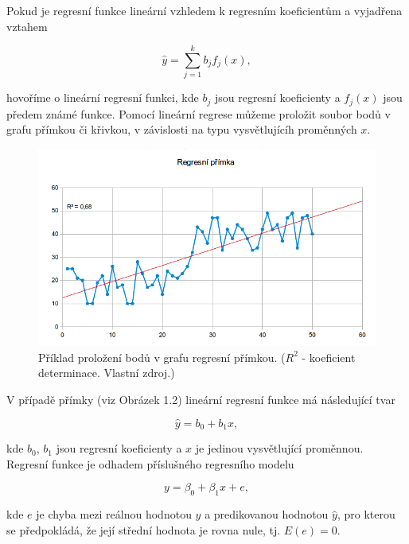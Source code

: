 \documentclass[a4paper,12pt,twoside]{scrreprt}
\begin{document}
Pokud je regresní funkce lineární vzhledem k regresním koeficientům a vyjadřena vztahem 

\begin{equation}
\hat{y} = \sum_{j=1}^{k}b_jf_j(x),
\end{equation}

hovoříme o lineární regresní funkci, kde \textit{$b_j$} jsou regresní koeficienty a \textit{$f_j$}$(x)$ jsou předem známé funkce. Pomocí lineární regrese můžeme proložit soubor bodů v grafu přímkou či křivkou, v závislosti na typu vysvětlujícíh proměnných $x$. 

\begin{figure}[h]
  \centering
  \includegraphics[width=15cm]{pictures/primka.png}
  \caption{Příklad proložení bodů v grafu regresní přímkou. \newline($R^2$ - koeficient determinace. Vlastní zdroj.)}
  \label{fig:přímka}
\end{figure}

V případě přímky (viz Obrázek 1.2) lineární regresní funkce má následující tvar

\begin{equation}
\hat{y} = b_0 + b_1x,
\end{equation}

kde $b_0$, $b_1$ jsou regresní koeficienty a $x$ je jedinou vysvětlující proměnnou. Regresní funkce je odhadem příslušného regresního modelu

\begin{equation}
y = \beta_0 + \beta_1x + e,
\end{equation}

kde $e$ je chyba mezi reálnou hodnotou $y$ a predikovanou hodnotou $\hat{y}$, pro kterou se předpokládá, že její střední hodnota je rovna nule, tj. $E(e) = 0$.
\end{document}
